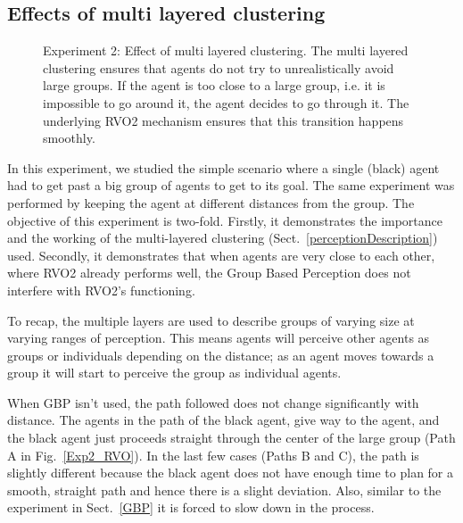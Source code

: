 \documentclass[runningheads,a4paper]{llncs}
\begin{document}
\subsection{Effects of multi layered clustering}

\begin{figure}[!t]
  \centering
   \hspace{1pt}
  \caption{Experiment 2: Effect of multi layered clustering. The multi layered clustering ensures that agents do not try to unrealistically avoid large groups. If the agent is too close to a large group, i.e. it is impossible to go around it, the agent decides to go through it. The underlying RVO2 mechanism ensures that this transition happens smoothly.}
  \label{Exp2}
\end{figure}

In this experiment, we studied the simple scenario where a single (black) agent had to get past a big group of agents to get to its goal. The same experiment was performed by keeping the agent at different distances from the group. The objective of this experiment is two-fold. Firstly, it demonstrates the importance and the working of the multi-layered clustering (Sect.~\ref{perceptionDescription}) used. Secondly, it demonstrates that when agents are very close to each other, where RVO2 already performs well, the Group Based Perception does not interfere with RVO2's functioning.

To recap, the multiple layers are used to describe groups of varying size at varying ranges of perception. This means agents will perceive other agents as groups or individuals depending on the distance; as an agent moves towards a group it will start to perceive the group as individual agents. 

When GBP isn't used, the path followed does not change significantly with distance. The agents in the path of the black agent, give way to the agent, and the black agent just proceeds straight through the center of the large group (Path A in Fig.~\ref{Exp2_RVO}). In the last few cases (Paths B and C), the path is slightly different because the black agent does not have enough time to plan for a smooth, straight path and hence there is a slight deviation. Also, similar to the experiment in Sect.~\ref{GBP} it is forced to slow down in the process.
\end{document}
